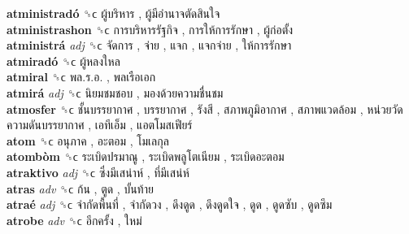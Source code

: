 \textbf{atministradó} ␝ϲ   ผู้บริหาร ,  ผู้มีอำนาจตัดสินใจ   \\
\textbf{atministrashon} ␝ϲ   การบริหารรัฐกิจ ,  การให้การรักษา ,  ผู้ก่อตั้ง   \\
\textbf{atministrá} \emph{adj}  ␝ϲ   จัดการ ,  จ่าย ,  แจก ,  แจกจ่าย ,  ให้การรักษา   \\
\textbf{atmiradó} ␝ϲ   ผู้หลงใหล   \\
\textbf{atmiral} ␝ϲ   พล.ร.อ. ,  พลเรือเอก   \\
\textbf{atmirá} \emph{adj}  ␝ϲ   นิยมชมชอบ ,  มองด้วยความชื่นชม   \\
\textbf{atmosfer} ␝ϲ   ชั้นบรรยากาศ ,  บรรยากาศ ,  รังสี ,  สภาพภูมิอากาศ ,  สภาพแวดล้อม ,  หน่วยวัดความดันบรรยากาศ ,  เอทีเอ็ม ,  แอตโมสเฟียร์   \\
\textbf{atom} ␝ϲ   อนุภาค ,  อะตอม ,  โมเลกุล   \\
\textbf{atombòm} ␝ϲ   ระเบิดปรมาณู ,  ระเบิดพลูโตเนียม ,  ระเบิดอะตอม   \\
\textbf{atraktivo} \emph{adj}  ␝ϲ   ซึ่งมีเสน่าห์ ,  ที่มีเสน่ห์   \\
\textbf{atras} \emph{adv}  ␝ϲ   ก้น ,  ตูด ,  บั้นท้าย   \\
\textbf{atraé} \emph{adj}  ␝ϲ   จำกัดพื้นที่ ,  จำกัดวง ,  ดึงดูด ,  ดึงดูดใจ ,  ดูด ,  ดูดซับ ,  ดูดซึม   \\
\textbf{atrobe} \emph{adv}  ␝ϲ   อีกครั้ง ,  ใหม่   \\
